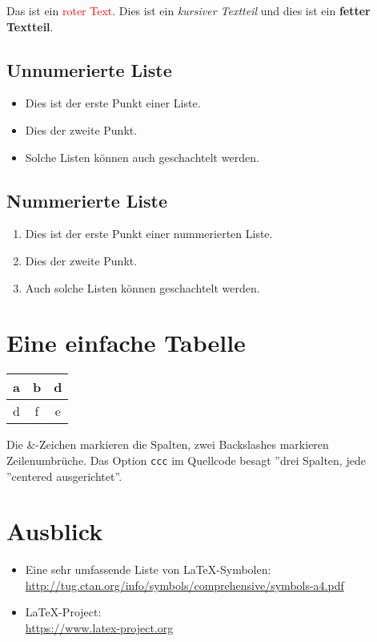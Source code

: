 Das ist ein \textcolor{red}{roter Text}. Dies ist ein {\itshape kursiver Textteil} und dies ist ein {\bfseries fetter Textteil}. 

\subsection{Unnumerierte Liste}

\begin{itemize}
	\item Dies ist der erste Punkt einer Liste.
  	\item Dies der zweite Punkt.
  	\item Solche Listen können auch geschachtelt werden.
\end{itemize} 

\subsection{Nummerierte Liste}

\begin{enumerate}
	\item Dies ist der erste Punkt einer nummerierten Liste.
	\item Dies der zweite Punkt.
	\item Auch solche Listen können geschachtelt werden.
\end{enumerate}  		


\section{Eine einfache Tabelle}

\begin{center}
	\begin{tabular}{ccc}
		a & b & d	\\ \hline
		d & f & e
	\end{tabular}
\end{center}

Die \&-Zeichen markieren die Spalten, zwei Backslashes markieren Zeilenumbrüche. Das Option \texttt{ccc} im Quellcode besagt ''drei Spalten, jede ''centered ausgerichtet''. 

\section{Ausblick}

\begin{itemize}
	\item Eine sehr umfassende Liste von LaTeX-Symbolen: \\
		\href{http://tug.ctan.org/info/symbols/comprehensive/symbols-a4.pdf}{http://tug.ctan.org/info/symbols/comprehensive/symbols-a4.pdf}
	\item LaTeX-Project: \\
		\href{https://www.latex-project.org}{https://www.latex-project.org}
\end{itemize}	
		
